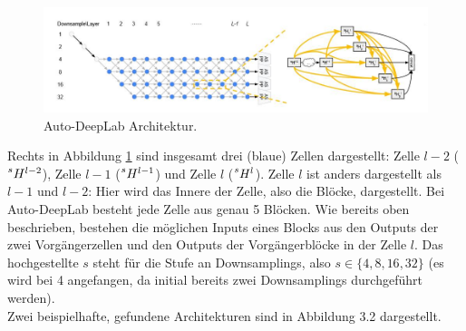 \begin{figure}[H]
	\centering
	\includegraphics[width=1\textwidth]{Pictures/AutoDeepLab/Autodeeplab1.jpg}
	\caption{Auto-DeepLab Architektur. \cite{autodeeplabPaper}}
	\label{pic:autodeeplab_Architektur}
\end{figure}

Rechts in Abbildung \ref{pic:autodeeplab_Architektur} sind insgesamt drei (blaue) Zellen dargestellt: Zelle $l-2$ ($\prescript{s}{}{H}^{l-2}$), Zelle $l-1$ ($\prescript{s}{}{H}^{l-1}$) und Zelle $l$ ($\prescript{s}{}{H}^{l}$). Zelle $l$ ist anders dargestellt als $l-1$ und $l-2$: Hier wird das Innere der Zelle, also die Blöcke, dargestellt. Bei Auto-DeepLab besteht jede Zelle aus genau 5 Blöcken. Wie bereits oben beschrieben, bestehen die möglichen Inputs eines Blocks aus den Outputs der zwei Vorgängerzellen und den Outputs der Vorgängerblöcke in der Zelle $l$. Das hochgestellte $s$ steht für die Stufe an Downsamplings, also $s \in \{4,8,16,32\}$ (es wird bei 4 angefangen, da initial bereits zwei Downsamplings durchgeführt werden).\\[0.3cm]
Zwei beispielhafte, gefundene Architekturen sind in Abbildung 3.2 dargestellt.\\

